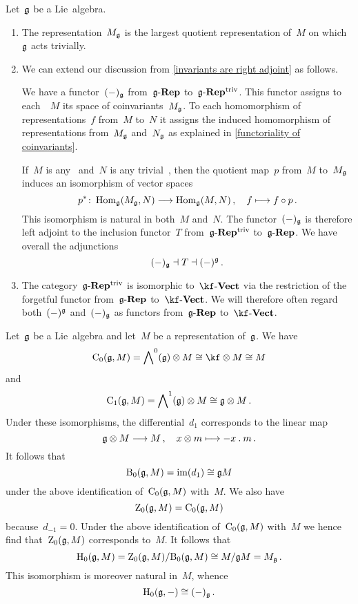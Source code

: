 \begin{remark}
	Let~$\glie$ be a Lie~algebra.
	\begin{enumerate}
		\item
			The representation~$M_{\mathfrak{g}}$ is the largest quotient representation of~$M$ on which~$\glie$ acts trivially.
		\item
			We can extend our discussion from \cref{invariants are right adjoint} as follows.

			We have a functor~$(-)_{\mathfrak{g}}$ from~$\mathfrak{g}\text{-}\mathbf{Rep}$ to~$\smash{\mathfrak{g}\text{-}\mathbf{Rep}}^{\mathrm{triv}}$.
			This functor assigns to each~\representation{$\glie$}~$M$ its space of coinvariants~$M_{\mathfrak{g}}$.
			To each homomorphism of representations~$f$ from~$M$ to~$N$ it assigns the induced homomorphism of representations from~$M_{\mathfrak{g}}$ and~$N_{\mathfrak{g}}$ as explained in \cref{functoriality of coinvariants}.

			If~$M$ is any~\representation{$\glie$} and~$N$ is any trivial~\representation{$\glie$}, then the quotient map~$p$ from~$M$ to~$M_{\mathfrak{g}}$ induces an isomorphism of vector spaces
			\[
				p^*
				\colon
				\Hom_{\glie}(M_{\glie}, N)
				\to
				\Hom_{\glie}(M, N) \,,
				\quad
				f
				\mapsto
				f \circ p \,.
			\]
			This isomorphism is natural in both~$M$ and~$N$.
			The functor~$(-)_{\mathfrak{g}}$ is therefore left adjoint to the inclusion functor~$T$ from~$\smash{\mathfrak{g}\text{-}\mathbf{Rep}}^{\mathrm{triv}}$ to~$\mathfrak{g}\text{-}\mathbf{Rep}$.
			We have overall the adjunctions
			\[
				(-)_{\mathfrak{g}}
				\dashv
				T
				\dashv
				(-)^{\mathfrak{g}} \,.
			\]
		\item
			The category~$\smash{\mathfrak{g}\text{-}\mathbf{Rep}}^{\mathrm{triv}}$ is isomorphic to~$\cVect{\kf}$ via the restriction of the forgetful functor from~$\mathfrak{g}\text{-}\mathbf{Rep}$ to~$\cVect{\kf}$.
			We will therefore often regard both~$(-)^{\mathfrak{g}}$ and~$(-)_{\mathfrak{g}}$ as functors from~$\mathfrak{g}\text{-}\mathbf{Rep}$ to~$\cVect{\kf}$.
	\end{enumerate}
\end{remark}


\begin{fluff}
	Let~$\glie$ be a Lie~algebra and let~$M$ be a representation of~$\glie$.
	We have
	\[
		\Chain_0(\glie, M)
		=
		\Exterior^0(\glie) \tensor M
		\cong
		\kf \tensor M
		\cong
		M
	\]
	and
	\[
		\operatorname{C}_1(\mathfrak{g}, M)
		=
		\operatorname{\bigwedge}^1(\mathfrak{g}) \otimes M
		\cong
		\mathfrak{g} \otimes M \,.
	\]
	Under these isomorphisms, the differential~$d_1$ corresponds to the linear map
	\[
		\glie \tensor M
		\to
		M \,,
		\quad
		x \tensor m
		\mapsto
		- x \act m \,.
	\]
	It follows that
	\[
		\operatorname{B}_0(\mathfrak{g}, M)
		=
		\operatorname{im}(d_1)
		\cong
		\mathfrak{g} M
	\]
	under the above identification of~$\operatorname{C}_0(\mathfrak{g}, M)$ with~$M$.
	We also have
	\[
		\operatorname{Z}_0(\mathfrak{g}, M)
		=
		\operatorname{C}_0(\mathfrak{g}, M)
	\]
	because~$d_{-1} = 0$.
	Under the above identification of~$\operatorname{C}_0(\mathfrak{g}, M)$ with~$M$ we hence find that~$\operatorname{Z}_0(\mathfrak{g}, M)$ corresponds to~$M$.
	It follows that
	\[
		\Homology_0(\glie, M)
		=
		\Cycle_0(\glie, M) / { \Boundary_0(\glie, M) }
		\cong
		M / \glie M
		=
		M_{\glie} \,.
		\index{coinvariants}
	\]
	This isomorphism is moreover natural in~$M$, whence
	\[
		\operatorname{H}_0(\mathfrak{g}, -)
		\cong
		(-)_{\mathfrak{g}} \,.
	\]
\end{fluff}



